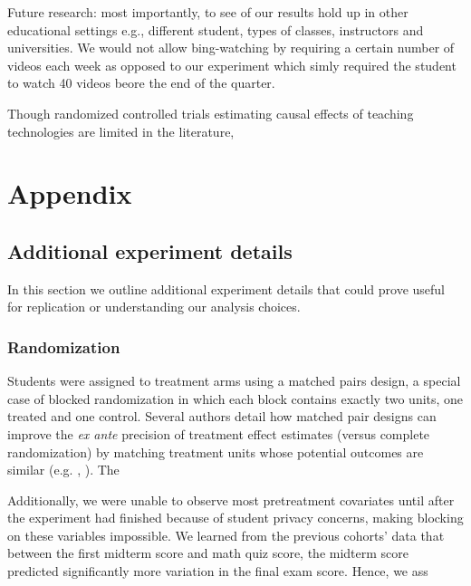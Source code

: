 \documentclass[12pt]{article}
\begin{document}
Future research: most importantly, to see of our results hold up in other educational settings e.g., different student, types of classes, instructors and universities. We would not allow bing-watching by requiring a certain number of videos each week as opposed to our experiment which simly required the student to watch 40 videos beore the end of the quarter.

Though randomized controlled trials estimating causal effects of teaching technologies are limited in the literature,

\printbibliography


\section*{Appendix}

\renewcommand{\thesubsection}{\Alph{subsection}}

\subsection{Additional experiment details}

In this section we outline additional experiment details that could prove useful for replication or understanding our analysis choices.

\subsubsection{Randomization} \label{a_randomization}
Students were assigned to treatment arms using a matched pairs design, a special case of blocked randomization in which each block contains exactly two units, one treated and one control. Several authors detail how matched pair designs can improve the \textit{ex ante} precision of treatment effect estimates (versus complete randomization) by matching treatment units whose potential outcomes are similar (e.g. \cite{ir2015}, \cite{ai2017}). The

Additionally, we were unable to observe most pretreatment covariates until after the experiment had finished because of student privacy concerns, making blocking on these variables impossible. We learned from the previous cohorts' data that between the first midterm score and math quiz score, the midterm score predicted significantly more variation in the final exam score. Hence, we ass
\end{document}

